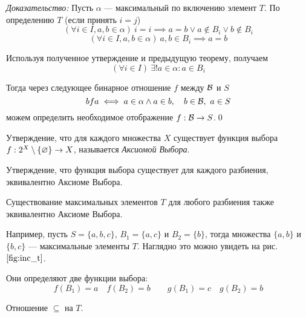{\it Доказательство:} Пусть $\alpha$ --- максимальный по включению
элемент $T$.
По определению $T$ (если принять $i=j$)
\[
	(\forall i\in I,a,b\in\alpha)~i=i\implies a=b\lor a\notin B_{i}\lor b\notin B_{i}
\]
\[
	(\forall i\in I,a,b\in\alpha)~a,b\in B_{i}\implies a=b
\]

Используя полученное утверждение и предыдущую теорему, получаем
\[
	(\forall i\in I)~\exists !a\in\alpha:a\in B_{i}
\]

Тогда через следующее бинарное отношение $f$ между $\mathcal B$ и $S$
\[
	bfa\iff a\in \alpha\land a\in b,\quad b\in\mathcal B,~a\in S
\]
можем определить необходимое отображение $f:\mathcal B\to S$.\qed

Утверждение, что для каждого множества $X$ существует функция
выбора $f:2^{X}\setminus\{\varnothing\}\to X$,
называется {\it Аксиомой Выбора}.

Утверждение, что функция выбора существует для каждого разбиения,
эквивалентно Аксиоме Выбора.

Существование максимальных элементов $T$ для любого
разбиения также эквивалентно Аксиоме Выбора.

Например, пусть $S=\{a,b,c\}$, $B_1=\{a,c\}$ и $B_2=\{b\}$, тогда
множества $\{a,b\}$ и $\{b,c\}$ --- максимальные элементы $T$.
Наглядно это можно увидеть на рис. $\ref{fig:inc_t}$.

Они определяют две функции выбора:
\[
	f(B_1)=a\quad f(B_2)=b\qquad g(B_1)=c\quad g(B_2)=b
\]

\begin{marginfigure}
	\center

	\caption{Отношение $\subseteq$ на $T$.}\label{fig:inc_t}
\end{marginfigure}

